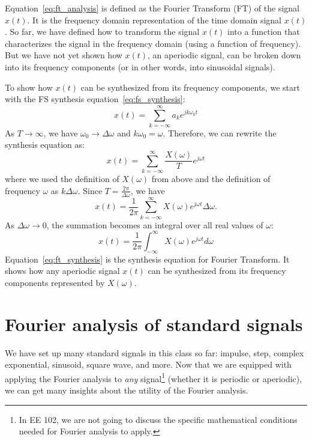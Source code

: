 \documentclass{ee102_notes}
\begin{document}
Equation~\eqref{eq:ft_analysis} is defined as the Fourier Transform (FT) of the signal $x(t)$. It is the frequency domain representation of the time domain signal $x(t)$. So far, we have defined how to transform the signal $x(t)$ into a function that characterizes the signal in the frequency domain (using a function of frequency). But we have not yet shown how $x(t)$, an aperiodic signal, can be broken down into its frequency components (or in other words, into sinusoidal signals). 

To show how $x(t)$ can be synthesized from its frequency components, we start with the FS synthesis equation~\eqref{eq:fs_synthesis}:
\[ 
  x(t) = \sum_{k=-\infty}^{\infty} a_k e^{jk\omega_0 t}
\]
As $T \to \infty$, we have $\omega_0 \to \Delta \omega$ and $k \omega_0 = \omega$. Therefore, we can rewrite the synthesis equation as:
\begin{equation*}
  x(t) = \sum_{k=-\infty}^{\infty} \frac{X(\omega)}{T} e^{j\omega t}
\end{equation*}
where we used the definition of $X(\omega)$ from above and the definition of frequency $\omega$ as $k \Delta \omega$. Since $T = \frac{2\pi}{\Delta \omega}$, we have
\[
  x(t) = \frac{1}{2\pi}\sum_{k=-\infty}^{\infty}  X(\omega) e^{j\omega t} \Delta \omega.
\]
As $\Delta \omega \to 0$, the summation becomes an integral over all real values of $\omega$:
\begin{equation}
  \label{eq:ft_synthesis}
  x(t) = \frac{1}{2\pi} \int_{-\infty}^{\infty} X(\omega) e^{j\omega t} d\omega
\end{equation}
Equation~\eqref{eq:ft_synthesis} is the synthesis equation for Fourier Transform. It shows how any aperiodic signal $x(t)$ can be synthesized from its frequency components represented by $X(\omega)$.
\section{Fourier analysis of standard signals}
We have set up many standard signals in this class so far:  impulse, step, complex exponential, sinusoid, square wave, and more. Now that we are equipped with applying the Fourier analysis to \emph{any} signal\footnote{In EE 102, we are not going to discuss the specific mathematical conditions needed for Fourier analysis to apply.} (whether it is periodic or aperiodic), we can get many insights about the utility of the Fourier analysis. 
\end{document}
